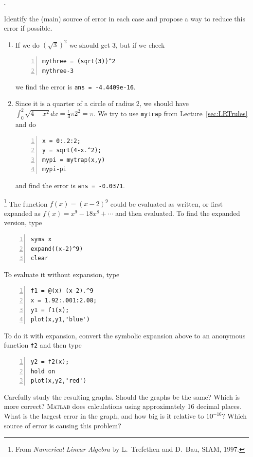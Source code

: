 \begin{list}
{.}{}

\item Identify the (main) source of error in each case and propose a
  way to reduce this error if possible.
  \begin{enumerate}
  \item[(a)] If we do $(\sqrt{3})^2$ we should get 3, but if we check
    \begin{lstlisting}[frame=none,numbers=left]
mythree = (sqrt(3))^2
mythree-3
    \end{lstlisting}
    we find the error is 
    \verb&ans = -4.4409e-16&.
  \item[(b)] Since it is a quarter of a circle of radius 2, we should
    have $\int_0^2 \sqrt{4-x^2}dx=\frac{1}{4}\pi2^2=\pi$. We try to
    use \verb&mytrap& from Lecture~\ref{sec:LRTrules} and do
    \begin{lstlisting}[frame=none,numbers=left]
x = 0:.2:2;
y = sqrt(4-x.^2);
mypi = mytrap(x,y)
mypi-pi
    \end{lstlisting}
    and find the error is \verb&ans = -0.0371&.
  \end{enumerate}

\item \footnote{From {\em Numerical Linear Algebra} by L.~Trefethen and D.~Bau, SIAM, 1997.}
The function $f(x)=(x-2)^9$ could be evaluated as written, or first
expanded as $f(x)=x^9-18x^8+\cdots$ and then evaluated.
To find the expanded version, type
\begin{lstlisting}[frame=none,numbers=left]
syms x
expand((x-2)^9)
clear
\end{lstlisting}
To evaluate it without expansion, type
\begin{lstlisting}[frame=none,numbers=left]
f1 = @(x) (x-2).^9
x = 1.92:.001:2.08;
y1 = f1(x);
plot(x,y1,'blue')
\end{lstlisting}
To do it with expansion, convert the symbolic expansion above to an anonymous
function \verb&f2& and then type
\begin{lstlisting}[frame=none,numbers=left]
y2 = f2(x);
hold on
plot(x,y2,'red')
\end{lstlisting}
Carefully study the resulting graphs. Should the graphs be the same?
Which is more correct? \textsc{Matlab} does calculations using
approximately 16 decimal places. What is the largest error in the
graph, and how big is it relative to $10^{-16}$? Which source of error
is causing this problem?

\end{list}

